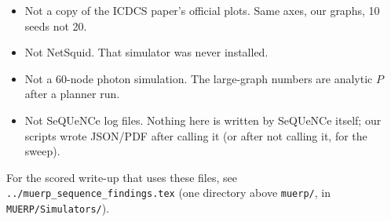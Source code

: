 \documentclass[11pt]{article}
\begin{document}
\begin{itemize}
\item Not a copy of the ICDCS paper's official plots. Same axes, our graphs, 10 seeds not 20.
\item Not NetSquid. That simulator was never installed.
\item Not a 60-node photon simulation. The large-graph numbers are analytic $P$ after a planner run.
\item Not SeQUeNCe log files. Nothing here is written by SeQUeNCe itself; our scripts wrote JSON/PDF after calling it (or after not calling it, for the sweep).
\end{itemize}

For the scored write-up that uses these files, see \texttt{../muerp\_sequence\_findings.tex} (one directory above \texttt{muerp/}, in \texttt{MUERP/Simulators/}).
\end{document}
